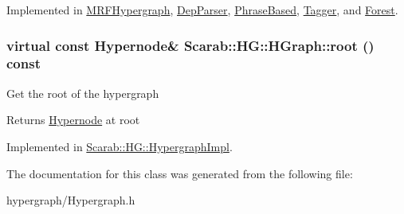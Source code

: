 Implemented in \hyperlink{classMRFHypergraph_aaac6b68c3ece41ddd1f8107e961879bc}{MRFHypergraph}, \hyperlink{classDepParser_a9aebbbde821bad423b6c01cc12f02a2c}{DepParser}, \hyperlink{classPhraseBased_aafc2997b58b3698fed7cb5a1f6f269c6}{PhraseBased}, \hyperlink{classTagger_a4ebe0aebd7c0392970b401a5a6c6cd72}{Tagger}, and \hyperlink{classForest_a621a1a65d0f877bb33b15c79f9e24c4d}{Forest}.

\hypertarget{classScarab_1_1HG_1_1HGraph_a5ede392b158e41dd7e95ded1c4b0b5d6}{
\subsubsection[{root}]{\setlength{\rightskip}{0pt plus 5cm}virtual const {\bf Hypernode}\& Scarab::HG::HGraph::root () const}}
\label{classScarab_1_1HG_1_1HGraph_a5ede392b158e41dd7e95ded1c4b0b5d6}
Get the root of the hypergraph

\begin{DoxyReturn}{Returns}
\hyperlink{classScarab_1_1HG_1_1Hypernode}{Hypernode} at root 
\end{DoxyReturn}


Implemented in \hyperlink{classScarab_1_1HG_1_1HypergraphImpl_a31172009b97d179f6b1199f191197a32}{Scarab::HG::HypergraphImpl}.



The documentation for this class was generated from the following file:\begin{DoxyCompactItemize}
\item 
hypergraph/Hypergraph.h\end{DoxyCompactItemize}
